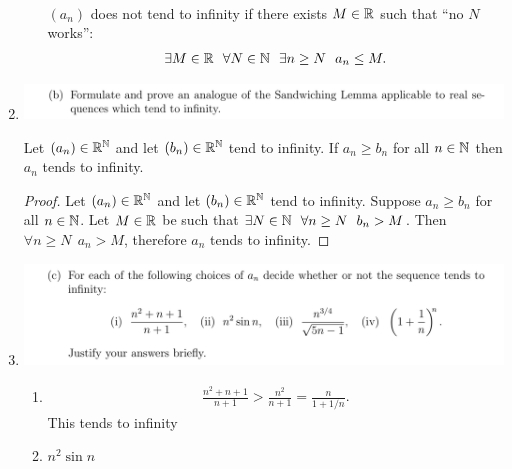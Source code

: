 \documentclass[12pt]{article}
\begin{document}
\begin{enumerate}[label=(\alph*)]
\begin{definition*}
\begin{enumerate}[label=(\roman*)]
\begin{align*}
      \end{align*}
      $(a_n)$ does not tend to infinity if there exists $M \in \mathbb{R}$ such that ``no $N$ works'':
      \begin{align*}
        \exists M \in \mathbb{R} ~~ \forall N \in \mathbb{N} ~~ \exists n \geq N ~~ a_n \leq M.
      \end{align*}
    \end{enumerate}
  \end{definition*}
\item\hspace{0pt}
  \begin{mdframed}
    \includegraphics[width=400pt]{img/oxford-M2-analysis-I-3-4-b.png}
  \end{mdframed}
  \begin{theorem*}
    Let $(a_n) \in \mathbb{R}^{\mathbb{N}}$ and let $(b_n) \in \mathbb{R}^{\mathbb{N}}$ tend to infinity. If $a_n \geq b_n$ for all
    $n \in \mathbb{N}$ then $a_n$ tends to infinity.
  \end{theorem*}
  \begin{proof}
    Let $(a_n) \in \mathbb{R}^{\mathbb{N}}$ and let $(b_n) \in \mathbb{R}^{\mathbb{N}}$ tend to infinity. Suppose $a_n \geq b_n$ for
    all $n \in \mathbb{N}$. Let $M \in \mathbb{R}$ be such that $\exists N \in \mathbb{N} ~~ \forall n \geq N ~~ b_n >
    M$. Then $\forall n \geq N ~~ a_n > M$, therefore $a_n$ tends to infinity.
  \end{proof}
\newpage
\item\hspace{0pt}
  \begin{mdframed}
    \includegraphics[width=400pt]{img/oxford-M2-analysis-I-3-4-c.png}
  \end{mdframed}
  \begin{enumerate}[label=(\roman*)]
  \item
    \begin{align*}
      \frac{n^2 + n + 1}{n + 1} > \frac{n^2}{n + 1} = \frac{n}{1 + 1/n}.
    \end{align*}
    This tends to infinity 
  \item $n^2\sin n$
  \end{enumerate}
\end{enumerate}
\end{document}
